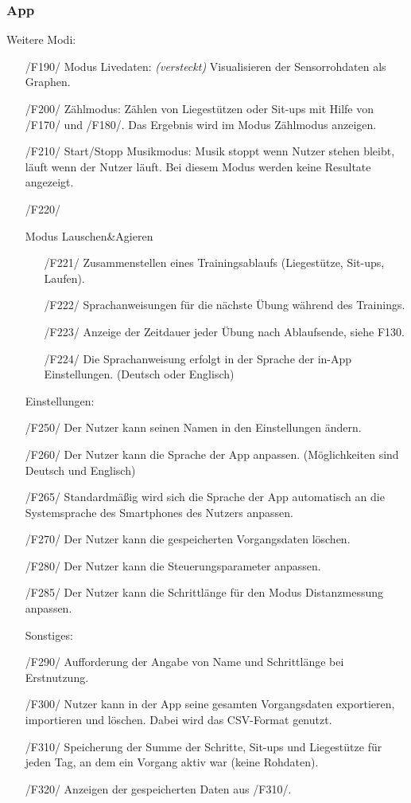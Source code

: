 \documentclass[a4paper,12pt]{article}
\begin{document}
    \subsubsection{App}
      Weitere Modi:
      \begin{itemize}
      \item[/F190/] \textsf{Modus Livedaten: \textit{(versteckt)}} Visualisieren der Sensorrohdaten als Graphen.
      \item[/F200/] \textsf{Zählmodus:} Zählen von Liegestützen oder Sit-ups mit Hilfe von /F170/ und /F180/. Das Ergebnis wird im Modus \glqq{} Zählmodus \grqq{} anzeigen.
      \item[/F210/] \textsf{Start/Stopp Musikmodus:} Musik stoppt wenn Nutzer stehen bleibt, läuft wenn der Nutzer läuft. Bei diesem Modus werden keine Resultate angezeigt.
      \item[/F220/]{
        Modus \glqq Lauschen\&Agieren\grqq
        \begin{itemize}
          \item[/F221/] Zusammenstellen eines Trainingsablaufs (Liegestütze, Sit-ups, Laufen). 
          \item[/F222/] Sprachanweisungen für die nächste Übung während des Trainings. 
          \item[/F223/] Anzeige der Zeitdauer jeder Übung nach Ablaufsende, siehe F130.
          \item[/F224/] Die Sprachanweisung erfolgt in der Sprache der in-App Einstellungen. (Deutsch oder Englisch)
        \end{itemize}
      }

      Einstellungen:
      \item[/F250/] Der Nutzer kann seinen Namen in den Einstellungen ändern.
      \item[/F260/] Der Nutzer kann die Sprache der App anpassen. (Möglichkeiten sind Deutsch und Englisch)
      \item[/F265/] Standardmäßig wird sich die Sprache der App automatisch an die Systemsprache des Smartphones des Nutzers anpassen.
      \item[/F270/] Der Nutzer kann die gespeicherten \Gls{Vorgangsdaten} löschen.
      \item[/F280/] Der Nutzer kann die \Gls{Steuerungsparameter} anpassen. 
      \item[/F285/] Der Nutzer kann die Schrittlänge für den Modus Distanzmessung anpassen.
      
      Sonstiges:
      \item[/F290/] Aufforderung der Angabe von Name und Schrittlänge bei Erstnutzung.
      \item[/F300/] Nutzer kann in der App seine gesamten \Gls{Vorgangsdaten} exportieren, importieren und löschen. Dabei wird das CSV-Format genutzt. 
      \item[/F310/] Speicherung der Summe der Schritte, Sit-ups und Liegestütze für jeden Tag, an dem ein \Gls{Vorgang} aktiv war (keine \Gls{Rohdaten}).
      \item[/F320/] Anzeigen der gespeicherten Daten aus /F310/.
      \end{itemize}
\end{document}
